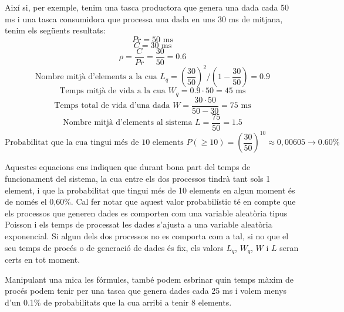 Així si, per exemple, tenim una tasca productora que genera una dada cada 50 ms i una tasca consumidora que processa una dada en uns 30 ms de mitjana, tenim els següents resultats:
\begin{equation*}
Pr = 50 \text{ ms}
\end{equation*}
\begin{equation*}
C = 30 \text{ ms}
\end{equation*}
\begin{equation*}
\rho = \frac{C}{Pr} = \frac{30}{50} = 0.6
\end{equation*}
\begin{equation*}
\text{Nombre mitjà d'elements a la cua } L_q = \left(\frac{30}{50}\right)^2 / \left(1 - \frac{30}{50}\right)  = 0.9
\end{equation*}
\begin{equation*}
\text{Temps mitjà de vida a la cua } W_q = 0.9 \cdot 50 = 45 \text{ ms}
\end{equation*}
\begin{equation*}
\text{Temps total de vida d'una dada } W =  \frac{30  \cdot 50}{50-30} = 75 \text{ ms}
\end{equation*}
\begin{equation*}
\text{Nombre mitjà d'elements al sistema } L =  \frac{75}{50} = 1.5
\end{equation*}
\begin{equation*}
\text{Probabilitat que la cua tingui més de 10 elements } P(\geqslant 10) =  \left(\frac{30}{50}\right)^{10} \approx 0,00605 \rightarrow 0.60 \%
\end{equation*}

Aquestes equacions ens indiquen que durant bona part del temps de funcionament del sistema, la cua entre els dos processos tindrà tant sols 1 element, i que la probabilitat que tingui més de 10 elements en algun moment és de només el 0,60\%.
Cal fer notar que aquest valor probabilístic té en compte que els processos que generen dades es comporten com una variable aleatòria tipus Poisson i els temps de processat les dades s'ajusta a una variable aleatòria exponencial. 
Si algun dels dos processos no es comporta com a tal, si no que el seu temps de procés o de generació de dades és fix, els valors $L_q$, $W_q$, $W$ i $L$ seran certs en tot moment.

Manipulant una mica les fórmules, també podem esbrinar quin temps màxim de procés podem tenir per una tasca que genera dades cada 25 ms i volem menys d'un 0.1\% de probabilitats que la cua arribi a tenir 8 elements.

